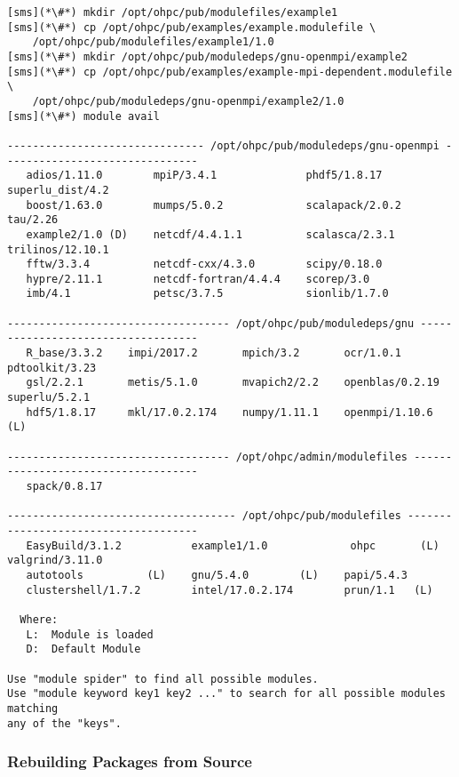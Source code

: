 \begin{lstlisting}[alsoletter={/,.},morekeywords={example1/1.0, example2/1.0}]
[sms](*\#*) mkdir /opt/ohpc/pub/modulefiles/example1
[sms](*\#*) cp /opt/ohpc/pub/examples/example.modulefile \
    /opt/ohpc/pub/modulefiles/example1/1.0
[sms](*\#*) mkdir /opt/ohpc/pub/moduledeps/gnu-openmpi/example2
[sms](*\#*) cp /opt/ohpc/pub/examples/example-mpi-dependent.modulefile \
    /opt/ohpc/pub/moduledeps/gnu-openmpi/example2/1.0
[sms](*\#*) module avail

------------------------------- /opt/ohpc/pub/moduledeps/gnu-openmpi -------------------------------
   adios/1.11.0        mpiP/3.4.1              phdf5/1.8.17 superlu_dist/4.2
   boost/1.63.0        mumps/5.0.2             scalapack/2.0.2    tau/2.26
   example2/1.0 (D)    netcdf/4.4.1.1          scalasca/2.3.1 trilinos/12.10.1
   fftw/3.3.4          netcdf-cxx/4.3.0        scipy/0.18.0
   hypre/2.11.1        netcdf-fortran/4.4.4    scorep/3.0
   imb/4.1             petsc/3.7.5             sionlib/1.7.0

----------------------------------- /opt/ohpc/pub/moduledeps/gnu -----------------------------------
   R_base/3.3.2    impi/2017.2       mpich/3.2       ocr/1.0.1 pdtoolkit/3.23
   gsl/2.2.1       metis/5.1.0       mvapich2/2.2    openblas/0.2.19 superlu/5.2.1
   hdf5/1.8.17     mkl/17.0.2.174    numpy/1.11.1    openmpi/1.10.6  (L)

----------------------------------- /opt/ohpc/admin/modulefiles ------------------------------------
   spack/0.8.17

------------------------------------ /opt/ohpc/pub/modulefiles -------------------------------------
   EasyBuild/3.1.2           example1/1.0             ohpc       (L) valgrind/3.11.0
   autotools          (L)    gnu/5.4.0        (L)    papi/5.4.3
   clustershell/1.7.2        intel/17.0.2.174        prun/1.1   (L)

  Where:
   L:  Module is loaded
   D:  Default Module

Use "module spider" to find all possible modules.
Use "module keyword key1 key2 ..." to search for all possible modules matching
any of the "keys".
\end{lstlisting}

\subsubsection{Rebuilding Packages from Source}  \label{appendix:rpmbuild}


